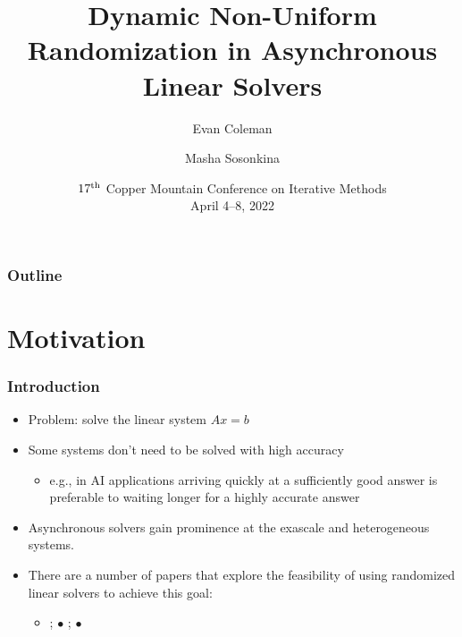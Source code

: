 \documentclass{beamer}
\title[Randomized Asynchronous Linear Solvers]{Dynamic Non-Uniform Randomization in Asynchronous Linear Solvers}
\author[Coleman \& Sosonkina]{Evan Coleman\inst{1} \and Masha Sosonkina\inst{2}}
\institute %
{
  \inst{1}%
  United State Department of Defense
   \and
  \inst{2}%
  Old Dominion University\\
}
\date{$17^{\rm th}$ Copper Mountain Conference on
Iterative Methods\\ April 4--8, 2022}
\begin{document}
%
\begin{frame}
	\titlepage
\end{frame}


\begin{frame}
	\frametitle{Outline}
	\tableofcontents
\end{frame}

\section{Motivation}

\begin{frame}
	\frametitle{Introduction}
	\begin{itemize}
		\item Problem: solve the linear system $Ax = b$
		\item Some systems don't need to be solved with high accuracy
		    \begin{itemize}
		        \item e.g., in AI applications arriving quickly at a sufficiently good answer is preferable to waiting longer for a highly accurate answer
		    \end{itemize}
		\item Asynchronous solvers gain prominence at the exascale and heterogeneous systems.
	    \item There are a number of papers that explore the feasibility of using randomized linear solvers to achieve this goal:
	        \begin{itemize}
	            \item \textcite{leventhal2010randomized}; 
	            $\bullet$ \textcite{griebel2012greedy};
	            $\bullet$ \textcite{avron2015revisiting}
	        \end{itemize}
	\end{itemize}	
\end{frame}

\end{document}
